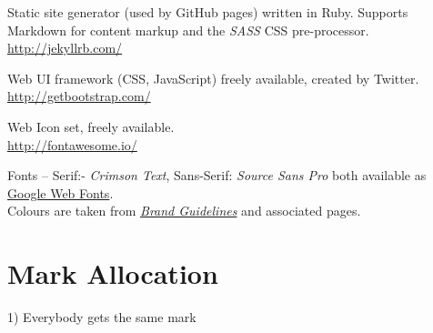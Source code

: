 \documentclass[a4paper, notoc]{tufte-handout}
\let\origdescription\description
\renewenvironment{description}{
  \setlength{\leftmargini}{1.5em}
  \origdescription
  \setlength{\itemindent}{-1.5em}
  \setlength{\labelsep}{\textwidth}
}
{\endlist}
\begin{document}
\begin{description}

\item[Jekyll]
Static site generator (used by GitHub pages) written in Ruby. Supports Markdown for 
content markup and the \textit{SASS} CSS pre-processor.
\\
\href{http://jekyllrb.com/}{http://jekyllrb.com/}

\item[BootStrap]
Web UI framework (CSS, JavaScript) freely available, created by Twitter.
\\
\href{http://getbootstrap.com/}{http://getbootstrap.com/}

\item[FontAwesome]
Web Icon set, freely available.
\\
\href{http://fontawesome.io/}{http://fontawesome.io/}


\item[University of Edinburgh Style Guide]
Fonts -- Serif:- \textit{Crimson Text}, Sans-Serif: \textit{Source Sans Pro} both 
available as \href{https://fonts.google.com/}{Google Web Fonts}.
\\
Colours are taken from 
\href{http://www.ed.ac.uk/communications-marketing/resources}{\textit{Brand Guidelines}} 
and associated pages.
\\



\end{description}




\section*{Mark Allocation}



1) Everybody gets the same mark




%
%
\end{document}
